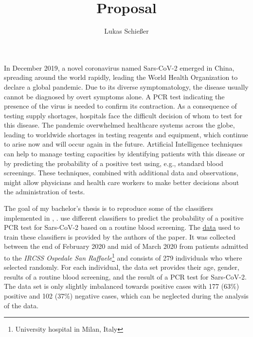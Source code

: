 \documentclass[12pt,a4paper,oneside]{article}
\title{Proposal}
\author{Lukas Schießer}
\date{}
\begin{document}
\maketitle
In December 2019, a novel coronavirus named Sars-CoV-2 emerged in China, spreading around the world rapidly, leading the World Health Organization to declare a global pandemic. Due to its diverse symptomatology, the disease usually cannot be diagnosed by overt symptoms alone. A PCR test indicating the presence of the virus is needed to confirm its contraction.
As a consequence of testing supply shortages, hospitals face the difficult decision of whom to test for this disease.
The pandemic overwhelmed healthcare systems across the globe, leading to worldwide shortages in testing reagents and equipment, which continue to arise now and will occur again in the future. \cite{jaecklin_2020, asm.org_2020}
Artificial Intelligence techniques can help to manage testing capacities by identifying patients with this disease or by predicting the probability of a positive test using, e.g., standard blood screenings. These techniques, combined with additional data and observations, might allow physicians and health care workers to make better decisions about the administration of tests.
\par
The goal of my bachelor's thesis is to reproduce some of the classifiers implemented in \citeauthor{RN127}, \citeyear{RN127} \cite{RN127}. \citeauthor{RN127} use different classifiers to predict the probability of a positive PCR test for Sars-CoV-2 based on a routine blood screening. The \href{https://zenodo.org/record/3886927/files/covid_study_v2.xlsx?download=1}{data} used to train these classifiers is provided by the authors of the paper. It was collected between the end of February 2020 and mid of March 2020 from patients admitted to the \textit{IRCSS Ospedale San Raffaele}\footnote{University hospital in Milan, Italy} and consists of 279 individuals who where selected randomly. For each individual, the data set provides their age, gender, results of a routine blood screening, and the result of a PCR test for Sars-CoV-2. The data set is only slightly imbalanced towards positive cases with 177 (63\%) positive and 102 (37\%) negative cases, which can be neglected during the analysis of the data.
\par
\end{document}
